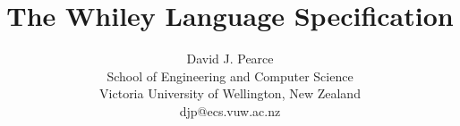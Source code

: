 \documentclass[10pt]{book}
\title{\Huge The Whiley Language Specification}
\author{David J. Pearce\\School of Engineering
  and Computer Science\\Victoria University of Wellington, New
  Zealand\\djp@ecs.vuw.ac.nz}
\begin{document}
\maketitle
\tableofcontents









%
%
%

\printglossaries



\end{document}
